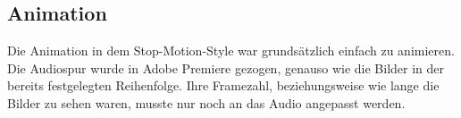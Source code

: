 \subsection{Animation}
Die Animation in dem Stop-Motion-Style war grundsätzlich einfach zu animieren. Die Audiospur wurde in Adobe Premiere gezogen, genauso wie die Bilder in der bereits festgelegten Reihenfolge. Ihre Framezahl, beziehungsweise wie lange die Bilder zu sehen waren, musste nur noch an das Audio angepasst werden.

